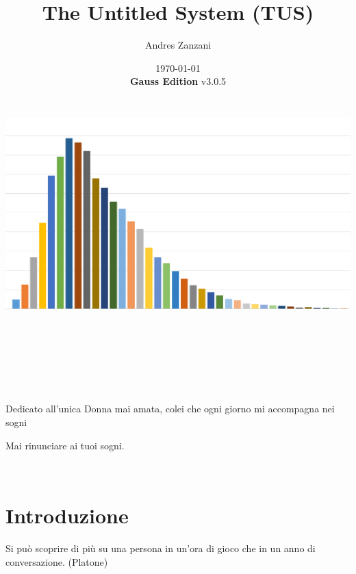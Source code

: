 \documentclass[a4paper,11pt,twoside,openany]{book}
\begin{document}
\title{The Untitled System (TUS)}
\date{\today\\\textbf{Gauss Edition} v3.0.5\\\includegraphics[bb=0 0 1148 636,width=6.85139in,height=3.79514in]{copertina.png}}
\author{Andres Zanzani}
\maketitle
\thispagestyle{empty}

\newpage~\newpage~



Dedicato all'unica Donna mai amata, colei che ogni giorno mi accompagna nei sogni

Mai rinunciare ai tuoi sogni.
\thispagestyle{empty}

\newpage~\thispagestyle{empty}%

\setcounter{page}{0}

\begin{multicols}{2}
	\tableofcontents{}
\end{multicols}

\pagebreak{}

\section{Introduzione}

\pagestyle{plain}

\begin{tcolorbox}[enhanced,arc=5pt,boxrule=0.3pt]{Si può scoprire di più su una persona in un'ora di gioco che in un anno di conversazione. (Platone)}\end{tcolorbox}\medskip
\end{document}
